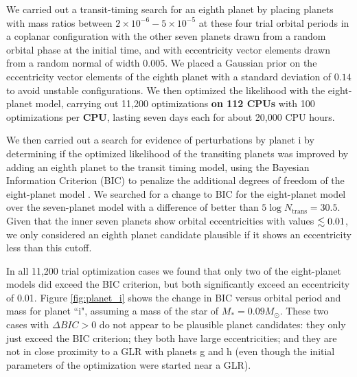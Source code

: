 \documentclass[twocolumn]{aastex63}
\begin{document}
We carried out a transit-timing search for an eighth planet by placing
planets with mass ratios between $2{\times}10^{-6}{-}5{\times}10^{-5}$ at
these four trial orbital periods
in a coplanar configuration with the other seven planets drawn from
a random orbital phase at the initial time, and with eccentricity
vector elements drawn from a random normal of width 0.005.   We
placed a Gaussian prior on the eccentricity vector elements of the eighth planet
with a standard deviation of $0.14$ to avoid unstable configurations.
We then optimized the likelihood with the eight-planet model, carrying
out 11,200 optimizations \textbf{on 112 CPUs}
with 100 optimizations per \textbf{CPU}, lasting seven days each for about 20,000 CPU hours.

We then carried out a search for evidence of perturbations by planet i by
determining if the optimized likelihood of the transiting planets was improved
by adding an eighth planet to the transit timing model, using
the Bayesian Information Criterion (BIC) to penalize the additional degrees
of freedom of the eight-planet model \citep{Wit2012}.  We searched for a change
to BIC for the eight-planet model over the seven-planet model with a difference
of better than $5\log{N_\mathrm{trans}} = 30.5$.  Given that the inner seven
planets show orbital eccentricities with values $\lesssim 0.01$, we only considered
an eighth planet candidate plausible if it shows an eccentricity less than
this cutoff.

In all 11,200 trial optimization cases we found that only two of the eight-planet models
did exceed the BIC criterion, but both significantly exceed an eccentricity
of 0.01.  Figure  \ref{fig:planet_i} shows the change in BIC versus
orbital period and mass for planet ``i", assuming a mass of the star
of $M_* = 0.09 M_\odot$.   These two cases with $\Delta BIC {>} 0$
do not appear to be plausible
planet candidates:  they only just exceed the BIC criterion;  they
both have large eccentricities; and they are not in close proximity to a
GLR with planets g and h (even though the initial parameters of the optimization were started near a GLR).
\end{document}
